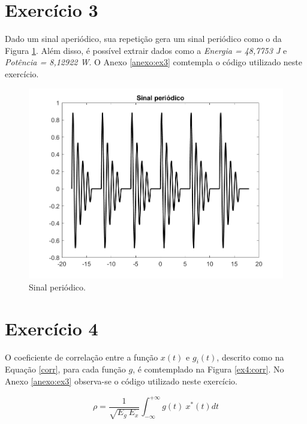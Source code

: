 \documentclass[a4paper,12pt,oneside,openany,table,xcdraw]{article}
\begin{document}
\vspace{0.3cm}
\section{Exercício 3}
Dado um sinal aperiódico, sua repetição gera um sinal periódico como o da Figura \ref{ex3:sinal}. Além disso, é possível extrair dados como a \textit{Energia = 48,7753 J} e \textit{Potência = 8,12922 W}. O Anexo \ref{anexo:ex3} comtempla o código utilizado neste exercício.

\vspace{0.4cm}
\begin{figure}[H]
\centering
\includegraphics[width=16cm]{ex3-sinal}
\caption{Sinal periódico.}
\label{ex3:sinal}
\end{figure}

\vspace{0.3cm}
\section{Exercício 4}
O coeficiente de correlação entre a função $x(t)$ e $g_i(t)$, descrito como na Equação \ref{corr}, para cada função $g$, é comtemplado na Figura \ref{ex4:corr}. No Anexo \ref{anexo:ex3} observa-se o código utilizado neste exercício.

\vspace{0.4cm}
\begin{equation} \label{corr}
\rho = \dfrac{1}{\sqrt{E_g\ E_x}} \int^{+\infty} _{-\infty} {g(t)\ x^*(t)} dt
\end{equation}
\end{document}
